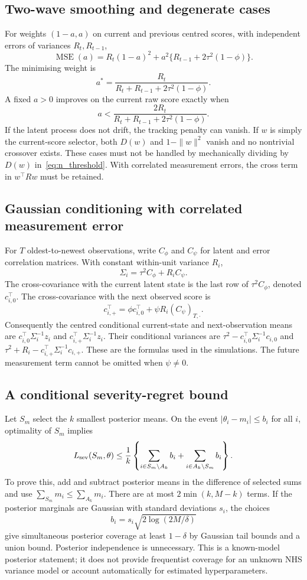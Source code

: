 \documentclass[11pt,letterpaper]{article}
\newcommand{\MSE}{\operatorname{MSE}}
\begin{document}
\subsection{Two-wave smoothing and degenerate cases}
For weights $(1-a,a)$ on current and previous centred scores, with independent errors of variances $R_t,R_{t-1}$,
\[
 \MSE(a)=R_t(1-a)^2+a^2\{R_{t-1}+2\tau^2(1-\phi)\}.
\]
The minimising weight is
\[
 a^*=\frac{R_t}{R_t+R_{t-1}+2\tau^2(1-\phi)}.
\]
A fixed $a>0$ improves on the current raw score exactly when
\[
 a<\frac{2R_t}{R_t+R_{t-1}+2\tau^2(1-\phi)}.
\]
If the latent process does not drift, the tracking penalty can vanish. If $w$ is simply the current-score selector, both $D(w)$ and $1-\|w\|^2$ vanish and no nontrivial crossover exists. These cases must not be handled by mechanically dividing by $D(w)$ in~\eqref{eq:n_threshold}. With correlated measurement errors, the cross term in $w^\top Rw$ must be retained.

\subsection{Gaussian conditioning with correlated measurement error}
For $T$ oldest-to-newest observations, write $C_\phi$ and $C_\psi$ for latent and error correlation matrices. With constant within-unit variance $R_i$,
\[
 \Sigma_i=\tau^2C_\phi+R_iC_\psi.
\]
The cross-covariance with the current latent state is the last row of $\tau^2C_\phi$, denoted $c_{i,0}^\top$. The cross-covariance with the next observed score is
\[
 c_{i,+}^\top=\phi c_{i,0}^\top+
               \psi R_i(C_\psi)_{T,\cdot}.
\]
Consequently the centred conditional current-state and next-observation means are $c_{i,0}^\top\Sigma_i^{-1}z_i$ and $c_{i,+}^\top\Sigma_i^{-1}z_i$. Their conditional variances are $\tau^2-c_{i,0}^\top\Sigma_i^{-1}c_{i,0}$ and $\tau^2+R_i-c_{i,+}^\top\Sigma_i^{-1}c_{i,+}$. These are the formulas used in the simulations. The future measurement term cannot be omitted when $\psi\ne0$.

\subsection{A conditional severity-regret bound}
Let $S_m$ select the $k$ smallest posterior means. On the event $|\theta_i-m_i|\le b_i$ for all $i$, optimality of $S_m$ implies
\[
 L_{\rm sev}(S_m,\theta)
 \le\frac1k\left\{\sum_{i\in S_m\setminus A_k}b_i+
                  \sum_{i\in A_k\setminus S_m}b_i\right\}.
\]
To prove this, add and subtract posterior means in the difference of selected sums and use $\sum_{S_m}m_i\le\sum_{A_k}m_i$. There are at most $2\min(k,M-k)$ terms. If the posterior marginals are Gaussian with standard deviations $s_i$, the choices
\[
 b_i=s_i\sqrt{2\log(2M/\delta)}
\]
give simultaneous posterior coverage at least $1-\delta$ by Gaussian tail bounds and a union bound. Posterior independence is unnecessary. This is a known-model posterior statement; it does not provide frequentist coverage for an unknown NHS variance model or account automatically for estimated hyperparameters.
\end{document}

